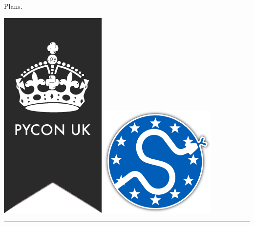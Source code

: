 \documentclass{beamer}
\begin{document}
\begin{frame}{Plans.}
    \begin{center}

        \includegraphics[height=0.25\textheight]{static/pyconuk.png}
        \hspace{3cm}
        \includegraphics[height=0.2\textheight]{static/euroscipy.png}
        
        \rule{\textwidth}{2pt}
        \vspace{5pt}


\end{center}
\end{frame}
\end{document}
